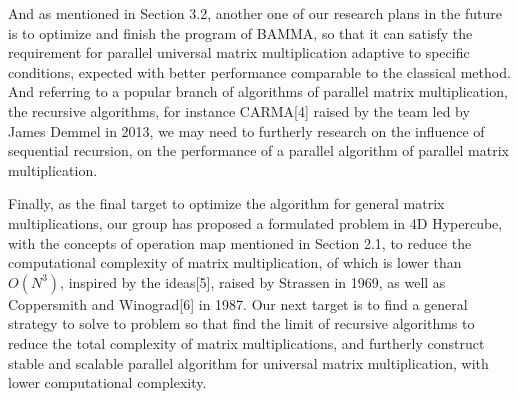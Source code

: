 \documentclass{amsart}
\theoremstyle{definition}
\theoremstyle{remark}
\numberwithin{equation}{section}
\begin{document}
	And as mentioned in Section 3.2, another one of our research plans in the future is to optimize and finish the program of BAMMA, so that it can satisfy the requirement for parallel universal matrix multiplication adaptive to specific conditions, expected with better performance comparable to the classical method. And referring to a popular branch of algorithms of parallel matrix multiplication, the recursive algorithms, for instance CARMA[4] raised by the team led by James Demmel in 2013, we may need to furtherly research on the influence of sequential recursion, on the performance of a parallel algorithm of parallel matrix multiplication.
	
	Finally, as the final target to optimize the algorithm for general matrix multiplications, our group has proposed a formulated problem in 4D Hypercube, with the concepts of operation map mentioned in Section 2.1, to reduce the computational complexity of matrix multiplication, of which is lower than $O(N^3)$, inspired by the ideas[5], raised by Strassen in 1969, as well as Coppersmith and Winograd[6] in 1987. Our next target is to find a general strategy to solve to problem so that find the limit of recursive algorithms to reduce the total complexity of matrix multiplications, and furtherly construct stable and scalable parallel algorithm for universal matrix multiplication, with lower computational complexity.
\end{document}
